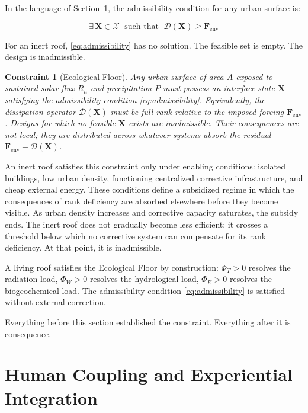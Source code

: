 \documentclass[12pt, a4paper]{article}
\theoremstyle{plain}
\newtheorem{constraint}{Constraint}
\theoremstyle{remark}
\begin{document}
In the language of Section~1, the admissibility condition for any urban surface is:

\begin{equation}
  \exists\, \mathbf{X} \in \mathcal{X} \;\text{ such that }\; \mathcal{D}(\mathbf{X}) \geq \mathbf{F}_{\text{env}}
  \label{eq:admissibility}
\end{equation}

\noindent For an inert roof, \eqref{eq:admissibility} has no solution. The feasible set is empty. The design is inadmissible.

\begin{constraint}[Ecological Floor]
Any urban surface of area $A$ exposed to sustained solar flux $R_n$ and precipitation $P$ must possess an interface state $\mathbf{X}$ satisfying the admissibility condition \eqref{eq:admissibility}. Equivalently, the dissipation operator $\mathcal{D}(\mathbf{X})$ must be full-rank relative to the imposed forcing $\mathbf{F}_{\text{env}}$. Designs for which no feasible $\mathbf{X}$ exists are inadmissible. Their consequences are not local; they are distributed across whatever systems absorb the residual $\mathbf{F}_{\text{env}} - \mathcal{D}(\mathbf{X})$.
\end{constraint}

An inert roof satisfies this constraint only under enabling conditions: isolated buildings, low urban density, functioning centralized corrective infrastructure, and cheap external energy. These conditions define a subsidized regime in which the consequences of rank deficiency are absorbed elsewhere before they become visible. As urban density increases and corrective capacity saturates, the subsidy ends. The inert roof does not gradually become less efficient; it crosses a threshold below which no corrective system can compensate for its rank deficiency. At that point, it is inadmissible.

A living roof satisfies the Ecological Floor by construction: $\Phi_T > 0$ resolves the radiation load, $\Phi_W > 0$ resolves the hydrological load, $\Phi_E > 0$ resolves the biogeochemical load. The admissibility condition \eqref{eq:admissibility} is satisfied without external correction.

Everything before this section established the constraint. Everything after it is consequence.

\section{Human Coupling and Experiential Integration}
\end{document}
